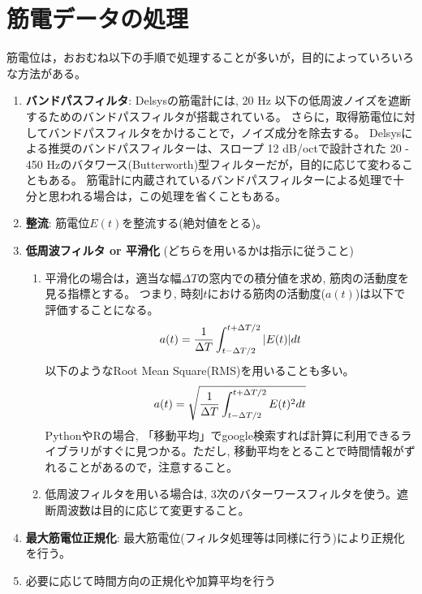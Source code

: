 \documentclass{ltjsarticle}
\begin{document}
\section{筋電データの処理}



筋電位は，おおむね以下の手順で処理することが多いが，目的によっていろいろな方法がある。

\begin{enumerate}
\item \textbf{バンドパスフィルタ}: 
Delsysの筋電計には, 20 Hz 以下の低周波ノイズを遮断するためのバンドパスフィルタが搭載されている。
さらに，取得筋電位に対してバンドパスフィルタをかけることで，ノイズ成分を除去する。
Delsysによる推奨のバンドパスフィルターは、スロープ 12 dB/octで設計された 20 - 450 Hzのバタワース(Butterworth)型フィルターだが，目的に応じて変わることもある。
筋電計に内蔵されているバンドパスフィルターによる処理で十分と思われる場合は，この処理を省くこともある。
\item \textbf{整流}: 筋電位$E(t)$を整流する(絶対値をとる)。
\item \textbf{低周波フィルタ or 平滑化} (どちらを用いるかは指示に従うこと)
  \begin{enumerate}
    \item 平滑化の場合は，適当な幅$\Delta T$の窓内での積分値を求め, 筋肉の活動度を見る指標とする。
    つまり, 時刻$t$における筋肉の活動度($a(t)$)は以下で評価することになる。
    \begin{align}
      a(t)=\frac{1}{\Delta T}\int_{t-\Delta T/2}^{t+\Delta T/2}|E(t)|dt\notag
    \end{align}
    以下のようなRoot Mean Square(RMS)を用いることも多い。
    \begin{align}
      a(t)=\sqrt{\frac{1}{\Delta T}\int_{t-\Delta T/2}^{t+\Delta T/2}E(t)^2dt}\notag
    \end{align}
    PythonやRの場合, 「移動平均」でgoogle検索すれば計算に利用できるライブラリがすぐに見つかる。ただし, 移動平均をとることで時間情報がずれることがあるので，注意すること。
    \item 低周波フィルタを用いる場合は, 3次のバターワースフィルタを使う。遮断周波数は目的に応じて変更すること。
  \end{enumerate}
\item \textbf{最大筋電位正規化}: 最大筋電位(フィルタ処理等は同様に行う)により正規化を行う。
\item 必要に応じて時間方向の正規化や加算平均を行う
\end{enumerate}
\end{document}
